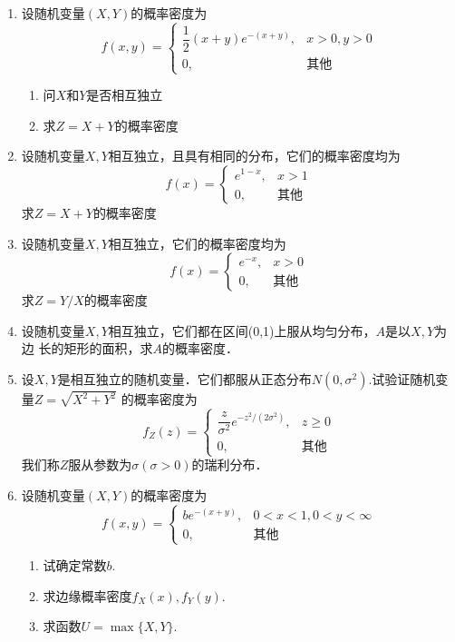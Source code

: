 \documentclass[10pt,a4paper]{article}
\begin{document}
\begin{enumerate}
    \item 设随机变量$(X,Y)$的概率密度为
    $$f(x,y)=\left\{\begin{array}{ll}
        \dfrac{1}{2}(x+y)e^{-(x+y)}, & x>0,y>0\\
        0, & \mbox{其他}
    \end{array}\right.$$
    \begin{enumerate}
        \item 问$X$和$Y$是否相互独立
        \item 求$Z=X+Y$的概率密度
    \end{enumerate}
    \clearpage


    \item 设随机变量$X,Y$相互独立，且具有相同的分布，它们的概率密度均为
    $$f(x)=\left\{\begin{array}{ll}
        e^{1-x}, & x>1\\
        0, & \mbox{其他}
    \end{array}\right.$$
    求$Z=X+Y$的概率密度
    \clearpage


    \item 设随机变量$X,Y$相互独立，它们的概率密度均为
    $$f(x)=\left\{\begin{array}{ll}
        e^{-x}, & x>0\\
        0, & \mbox{其他}
    \end{array}\right.$$
    求$Z=Y/X$的概率密度
    \clearpage


    \item 设随机变量$X,Y$相互独立，它们都在区间(0,1)上服从均匀分布，$A$是以$X,Y$为边
    长的矩形的面积，求$A$的概率密度．
    \clearpage


    \item 设$X,Y$是相互独立的随机变量．它们都服从正态分布$N(0,\sigma^2)$.试验证随机变量$Z=\sqrt{X^2+Y^2}$
    的概率密度为
    $$f_Z(z)=\left\{\begin{array}{ll}
        \dfrac{z}{\sigma^2}e^{-z^2/(2\sigma^2)}, & z\geq 0\\
        0, & \mbox{其他}
    \end{array}\right.$$
    我们称$Z$服从参数为$\sigma(\sigma>0)$的瑞利分布．
    \clearpage



    \item 设随机变量$(X,Y)$的概率密度为
    $$f(x,y)=\left\{\begin{array}{ll}
        be^{-(x+y)}, & 0<x<1,0<y<\infty\\
        0, & \mbox{其他}
    \end{array}\right.$$
    \begin{enumerate}
        \item 试确定常数$b$.
        \item 求边缘概率密度$f_X(x),f_Y(y)$.
        \item 求函数$U=\max\{X,Y\}$.
    \end{enumerate}
    \clearpage
   



\end{enumerate}
\end{document}
